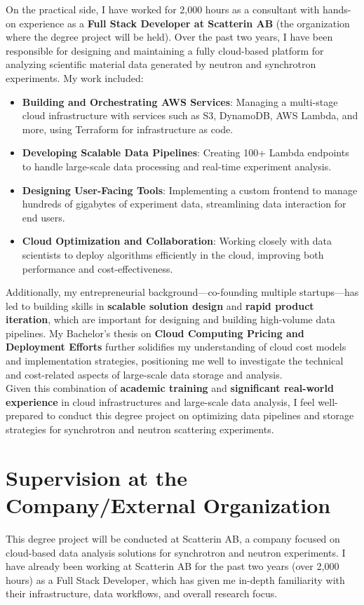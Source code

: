 \documentclass{article}
\begin{document}
On the practical side, I have worked for 2,000 hours as a consultant with hands-on experience as a \textbf{Full Stack Developer at Scatterin AB} (the organization where the degree project will be held). Over the past two years, I have been responsible for designing and maintaining a fully cloud-based platform for analyzing scientific material data generated by neutron and synchrotron experiments. My work included:

\begin{itemize}
    \item \textbf{Building and Orchestrating AWS Services}: Managing a multi-stage cloud infrastructure with services such as S3, DynamoDB, AWS Lambda, and more, using Terraform for infrastructure as code.
    \item \textbf{Developing Scalable Data Pipelines}: Creating 100+ Lambda endpoints to handle large-scale data processing and real-time experiment analysis. 
    \item \textbf{Designing User-Facing Tools}: Implementing a custom frontend to manage hundreds of gigabytes of experiment data, streamlining data interaction for end users.
    \item \textbf{Cloud Optimization and Collaboration}: Working closely with data scientists to deploy algorithms efficiently in the cloud, improving both performance and cost-effectiveness.
\end{itemize}

Additionally, my entrepreneurial background—co-founding multiple startups—has led to building skills in \textbf{scalable solution design} and \textbf{rapid product iteration}, which are important for designing and building high-volume data pipelines. My Bachelor's thesis on \textbf{Cloud Computing Pricing and Deployment Efforts} further solidifies my understanding of cloud cost models and implementation strategies, positioning me well to investigate the technical and cost-related aspects of large-scale data storage and analysis.\\

Given this combination of \textbf{academic training} and \textbf{significant real-world experience} in cloud infrastructures and large-scale data analysis, I feel well-prepared to conduct this degree project on optimizing data pipelines and storage strategies for synchrotron and neutron scattering experiments.

\section{Supervision at the Company/External Organization}
This degree project will be conducted at Scatterin AB, a company focused on cloud-based data analysis solutions for synchrotron and neutron experiments. I have already been working at Scatterin AB for the past two years (over 2,000 hours) as a Full Stack Developer, which has given me in-depth familiarity with their infrastructure, data workflows, and overall research focus.
\end{document}
